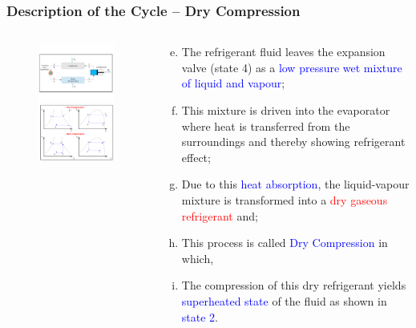 \documentclass[10pt,compress,handout,ignorenonframetext]{beamer}
\begin{document}
\begin{frame}
 \frametitle{Description of the Cycle -- Dry Compression}
  \begin{columns}
   \begin{column}[c]{0.5\linewidth}
    \begin{figure}%
     \vbox{
      \includegraphics[width=5.5cm,clip]{./Pics/Overview_Refrig12}
      \vspace{-.5cm}
      \includegraphics[width=4.5cm,clip]{./Pics/Overview_Refrig13}}
    \end{figure}  
   \end{column}  
   \begin{column}[c]{0.5\linewidth}
  \begin{enumerate}[(a)]\setcounter{enumi}{4}
   \item <1-> The refrigerant fluid leaves the expansion valve (state 4) as a \textcolor{blue}{low pressure wet mixture of liquid and vapour};
   \item <2-> This mixture is driven into the evaporator where heat is transferred from the surroundings and thereby showing refrigerant effect; 
   \item <3-> Due to this \textcolor{blue}{heat absorption}, the liquid-vapour mixture is transformed into a \textcolor{red}{dry gaseous refrigerant} and;
   \item <4-> This process is called \textcolor{blue}{Dry Compression} in which,
   \item <5-> The compression of this dry refrigerant yields \textcolor{blue}{superheated state} of the fluid as shown in \textcolor{blue}{state 2}.
  \end{enumerate}
 \end{column}  
\end{columns}
\end{frame}
\end{document}
